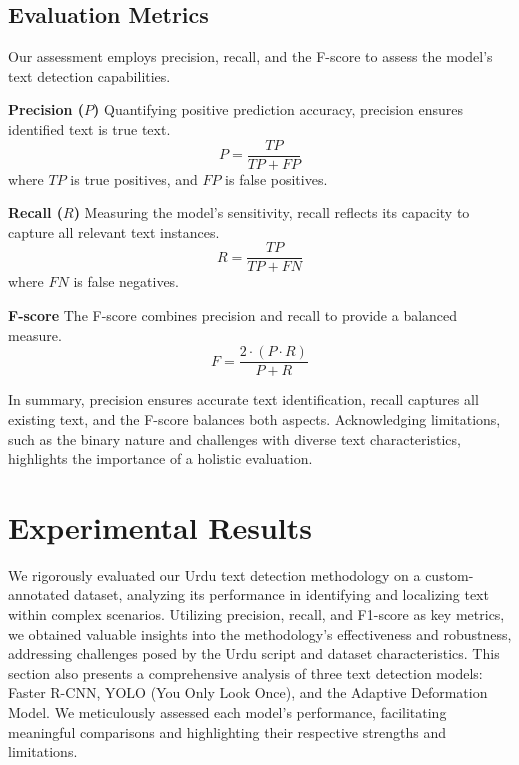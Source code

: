 \documentclass[default,iicol]{sn-jnl} %
\begin{document}
\subsection{Evaluation Metrics}

Our assessment employs precision, recall, and the F-score to assess the model's text detection capabilities.

\textbf{Precision (\(P\))}
Quantifying positive prediction accuracy, precision ensures identified text is true text. 
\begin{equation}
	P = \frac{TP}{TP + FP}
\end{equation} 
where \( TP \) is true positives, and \( FP \) is false positives.

\textbf{Recall (\(R\))}
Measuring the model's sensitivity, recall reflects its capacity to capture all relevant text instances.
\begin{equation}
	R = \frac{TP}{TP + FN}
\end{equation}
where \( FN \) is false negatives.
 
\textbf{F-score}
The F-score combines precision and recall to provide a balanced measure. 
\begin{equation}
	F = \frac{2 \cdot (P \cdot R)}{P + R}
\end{equation}

In summary, precision ensures accurate text identification, recall captures all existing text, and the F-score balances both aspects. Acknowledging limitations, such as the binary nature and challenges with diverse text characteristics, highlights the importance of a holistic evaluation.


\section{Experimental Results}
We rigorously evaluated our Urdu text detection methodology on a custom-annotated dataset, analyzing its performance in identifying and localizing text within complex scenarios. Utilizing precision, recall, and F1-score as key metrics, we obtained valuable insights into the methodology's effectiveness and robustness, addressing challenges posed by the Urdu script and dataset characteristics. This section also presents a comprehensive analysis of three text detection models: Faster R-CNN, YOLO (You Only Look Once), and the Adaptive Deformation Model. We meticulously assessed each model's performance, facilitating meaningful comparisons and highlighting their respective strengths and limitations.
\end{document}
